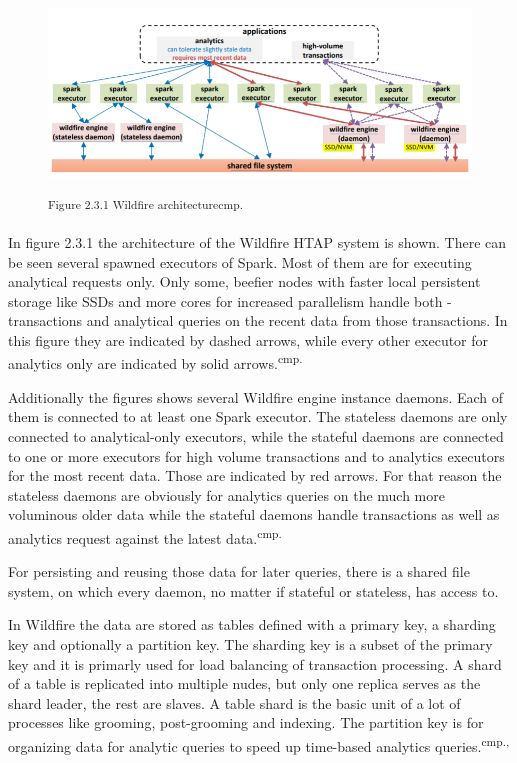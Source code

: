 \begin{figure}[h]
\centering
\includegraphics[width=\textwidth]{images/wildfire_architecture.png}

\textsuperscript{Figure 2.3.1 Wildfire architecture}\textsuperscript{cmp.\cite{29}}
\end{figure}

In figure 2.3.1 the architecture of the Wildfire HTAP system is shown. There can be seen several spawned executors of Spark. Most of them are for executing analytical requests only. Only some, beefier nodes with faster local persistent storage like SSDs and more cores for increased parallelism handle both - transactions and analytical queries on the recent data from those transactions. In this figure they are indicated by dashed arrows, while every other executor for analytics only are indicated by solid arrows.\textsuperscript{cmp.\cite{29}}

Additionally the figures shows several Wildfire engine instance daemons. Each of them is connected to at least one Spark executor. The stateless daemons are only connected to analytical-only executors, while the stateful daemons are connected to one or more executors for high volume transactions and to analytics executors for the most recent data. Those are indicated by red arrows. For that reason the stateless daemons are obviously for analytics queries on the much more voluminous older data while the stateful daemons handle transactions as well as analytics request against the latest data.\textsuperscript{cmp.\cite{29}}

For persisting and reusing those data for later queries, there is a shared file system, on which every daemon, no matter if stateful or stateless, has access to.%


In Wildfire the data are stored as tables defined with a primary key, a sharding key and optionally a partition key. The sharding key is a subset of the primary key and it is primarly used for load balancing of transaction processing. A shard of a table is replicated into multiple nudes, but only one replica serves as the shard leader, the rest are slaves. A table shard is the basic unit of a lot of processes like grooming, post-grooming and indexing. The partition key is for organizing data for analytic queries to speed up time-based analytics queries.\textsuperscript{cmp.\cite{29}, \cite{30}}

